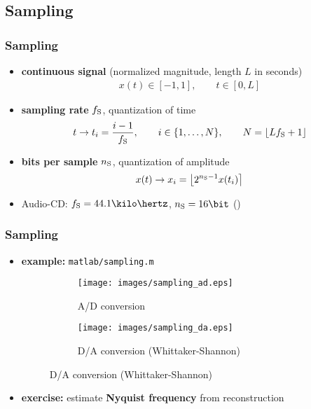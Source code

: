 
\subsection{Sampling}

\begin{frame}
	\frametitle{Sampling}
	\begin{itemize}
		\item \textbf{continuous signal} (normalized magnitude, length $L$ in seconds)
			\begin{align*}
				x(t)\in[-1,1],\qquad t\in[0,L]
			\end{align*}
		\item \textbf{sampling rate} $f_{\textrm S}$, quantization of time
			\begin{align*}
				t\rightarrow t_i=\frac{i-1}{f_{\textrm S}},\qquad i\in\{1,\ldots,N\},\qquad N=\lfloor Lf_{\textrm S}+1\rfloor
			\end{align*}
		\item \textbf{bits per sample} $n_{\textrm S}$, quantization of amplitude
			\begin{align*}
				x(t)\rightarrow x_i=\left\lfloor2^{n_{\textrm S}-1}x(t_i)\right\rceil
			\end{align*}
		\item Audio-CD: $f_{\textrm S}=44.1\kilo\hertz$, $n_{\textrm S}=16\bit$ ()
	\end{itemize}
\end{frame}

\begin{frame}
	\frametitle{Sampling}
	\begin{itemize}
		\item \textbf{example:} \texttt{matlab/sampling.m}
			\begin{figure}
				\centering
				\begin{subfigure}[t]{0.45\linewidth}
					\texttt{[image: images/sampling\_ad.eps]}
					\caption{A/D conversion}
				\end{subfigure}
				\begin{subfigure}[t]{0.45\linewidth}
					\texttt{[image: images/sampling\_da.eps]}
					\caption{D/A conversion (Whittaker-Shannon)}
				\end{subfigure}
			\end{figure}
		\item \textbf{exercise:} estimate \textbf{Nyquist frequency} from reconstruction
	\end{itemize}
\end{frame}

